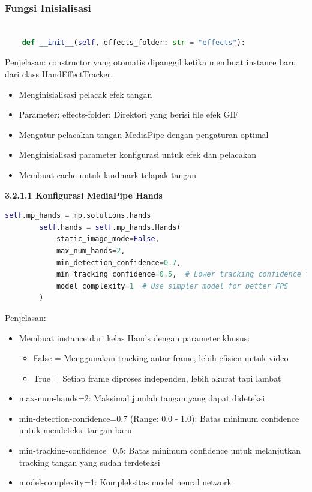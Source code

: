 \documentclass[11pt,a4paper]{article}
\begin{document}
    \subsubsection{Fungsi Inisialisasi}
    \begin{lstlisting}[language=Python, caption=Inisialisasi init]
    
    def __init__(self, effects_folder: str = "effects"):
    \end{lstlisting}
    Penjelasan:
    constructor yang otomatis dipanggil ketika membuat instance baru dari class HandEffectTracker.
    \begin{itemize}
        \item Menginisialisasi pelacak efek tangan
        \item Parameter: effects-folder: Direktori yang berisi file efek GIF
        \item Mengatur pelacakan tangan MediaPipe dengan pengaturan optimal
        \item Menginisialisasi parameter konfigurasi untuk efek dan pelacakan
        \item Membuat cache untuk landmark telapak tangan
        \end{itemize}
        
    \noindent\textbf{3.2.1.1 Konfigurasi MediaPipe Hands} 
    \begin{lstlisting}[language=Python, caption=Konfigurasi MediaPipe Hands]
     self.mp_hands = mp.solutions.hands
        self.hands = self.mp_hands.Hands(
            static_image_mode=False,
            max_num_hands=2,
            min_detection_confidence=0.7,
            min_tracking_confidence=0.5,  # Lower tracking confidence for better performance
            model_complexity=1  # Use simpler model for better FPS
        )
    \end{lstlisting}
    Penjelasan: 
        \begin{itemize}
            \item Membuat instance dari kelas Hands dengan parameter khusus:
            \begin{itemize}
                \item False = Menggunakan tracking antar frame, lebih efisien untuk video
                \item True = Setiap frame diproses independen, lebih akurat tapi lambat
            \end{itemize}
            \item max-num-hands=2: Maksimal jumlah tangan yang dapat dideteksi
            \item min-detection-confidence=0.7 (Range: 0.0 - 1.0): Batas minimum confidence untuk mendeteksi tangan baru
            \item min-tracking-confidence=0.5: Batas minimum confidence untuk melanjutkan tracking tangan yang sudah terdeteksi
            \item model-complexity=1: Kompleksitas model neural network
        \end{itemize}
\end{document}
